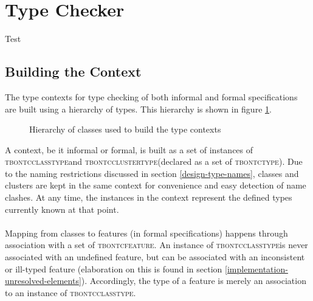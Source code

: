 \newcommand{\tbontype}{\textsc{tbon}\textunderscore \textsc{tc}\textunderscore  \textsc{type}}
\newcommand{\tbonclasstype}{\textsc{tbon}\textunderscore \textsc{tc}\textunderscore \textsc{class}\textunderscore  \textsc{type}}
\newcommand{\tbonclustertype}{\textsc{tbon}\textunderscore \textsc{tc}\textunderscore \textsc{cluster}\textunderscore  \textsc{type}}
\newcommand{\tbonfeature}{\textsc{tbon}\textunderscore \textsc{tc}\textunderscore \textsc{feature}}
\newcommand{\tbongeneric}{\textsc{tbon}\textunderscore \textsc{tc}\textunderscore \textsc{generic}}

\section{Type Checker}
Test
\label{implementation-def-boolean-type}
\label{implementation-set-expressions}


\subsection{Building the Context}
\label{implementation-context-class-structure}
The type contexts for type checking of both informal and formal specifications are built using a hierarchy of types. This hierarchy is shown in figure \ref{fig:context-classes}.
\begin{figure}[H]
    \caption[Context classes]{Hierarchy of classes used to build the type contexts}
    \label{fig:context-classes}
\end{figure}
A context, be it informal or formal, is built as a set of instances of \tbonclasstype   and \tbonclustertype   (declared as a set of \tbontype ). Due to the naming restrictions discussed in section \ref{design-type-names}, classes and clusters are kept in the same context for convenience and easy detection of name clashes. At any time, the instances in the context represent the defined types currently known at that point.
\paragraph{} Mapping from classes to features (in formal specifications) happens through association with a set of \tbonfeature . An instance of \tbonclasstype  is never associated with an undefined feature, but can be associated with an inconsistent or ill-typed feature (elaboration on this is found in section \ref{implementation-unresolved-elements}). Accordingly, the type of a feature is merely an association to an instance of \tbonclasstype .
